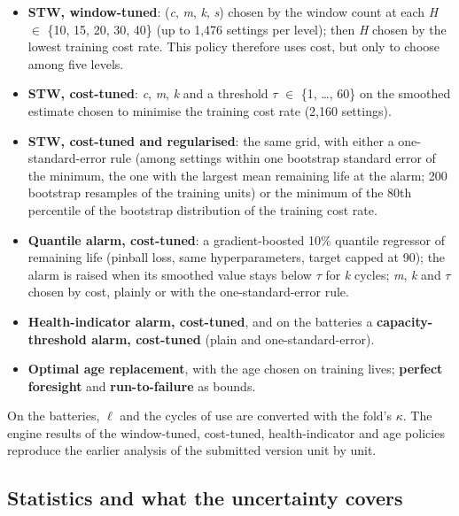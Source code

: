\documentclass[a4paper,fleqn,doubleblind]{cas-dc}
\begin{document}
\begin{itemize}[leftmargin=1.2em,itemsep=2pt]
\item \textbf{STW, window-tuned}: (\textit{c}, \textit{m}, \textit{k}, \textit{s}) chosen by the window count at each \textit{H} $\in$ \{10, 15, 20, 30, 40\} (up to 1,476 settings per level); then \textit{H} chosen by the lowest training cost rate. This policy therefore uses cost, but only to choose among five levels.
\item \textbf{STW, cost-tuned}: \textit{c}, \textit{m}, \textit{k} and a threshold $\tau$ $\in$ \{1, \ldots{}, 60\} on the smoothed estimate chosen to minimise the training cost rate (2,160 settings).
\item \textbf{STW, cost-tuned and regularised}: the same grid, with either a one-standard-error rule (among settings within one bootstrap standard error of the minimum, the one with the largest mean remaining life at the alarm; 200 bootstrap resamples of the training units) or the minimum of the 80th percentile of the bootstrap distribution of the training cost rate.
\item \textbf{Quantile alarm, cost-tuned}: a gradient-boosted 10\% quantile regressor of remaining life (pinball loss, same hyperparameters, target capped at 90); the alarm is raised when its smoothed value stays below $\tau$ for \textit{k} cycles; \textit{m}, \textit{k} and $\tau$ chosen by cost, plainly or with the one-standard-error rule.
\item \textbf{Health-indicator alarm, cost-tuned}, and on the batteries a \textbf{capacity-threshold alarm, cost-tuned} (plain and one-standard-error).
\item \textbf{Optimal age replacement}, with the age chosen on training lives; \textbf{perfect foresight} and \textbf{run-to-failure} as bounds.
\end{itemize}

On the batteries, $\ell$ and the cycles of use are converted with the fold's $\kappa$. The engine results of the window-tuned, cost-tuned, health-indicator and age policies reproduce the earlier analysis of the submitted version unit by unit.

\subsection{Statistics and what the uncertainty covers}
\end{document}
